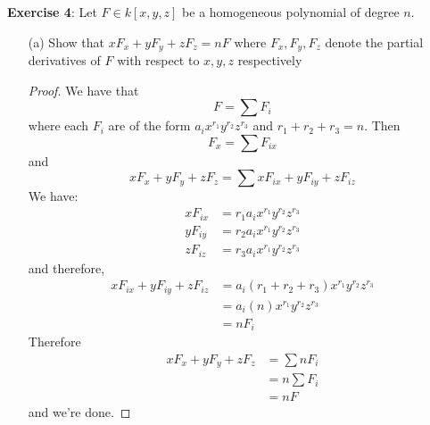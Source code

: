 \documentclass{article}
\begin{document}
\textbf{Exercise 4}: Let $F \in k[x, y, z]$ be a homogeneous polynomial of degree $n$.
    \begin{itemize}
        \item [(a)] Show that $xF_{x} + yF_{y} + zF_{z} = nF$ where $F_{x}, F_{y}, F_{z}$ denote the partial derivatives of $F$ with respect to $x, y, z$ respectively
            \begin{proof}
                We have that
                    \begin{equation*}
                        F = \sum F_{ i}
                    \end{equation*}
                where each $F_{i}$ are of the form $a_{i}x^{r_{1}}y^{r_{2}}z^{r_{3}}$ and $r_{1} + r_{2} + r_{3} = n$. Then
                    \begin{equation*}
                        F_{x} = \sum F_{ix} 
                    \end{equation*}
                and
                    \begin{equation*}
                        xF_{x} + yF_{y} + zF_{z} = \sum xF_{ ix} + yF_{iy} + zF_{iz}
                    \end{equation*}
                We have:
                    \begin{align*}
                        xF_{ix} &= r_{1}a_{i}x^{r_{1}}y^{r_{2}}z^{r_{3}} \\
                        yF_{iy} &= r_{2}a_{i}x^{r_{1}}y^{r_{2}}z^{r_{3}} \\
                        zF_{iz} &= r_{3}a_{i}x^{r_{1}}y^{r_{2}}z^{r_{3}}                     
                    \end{align*}
                and therefore,
                    \begin{align*}
                        xF_{ix} + yF_{iy} + zF_{iz} &= a_{i}(r_{1} + r_{2} + r_{3})x^{r_{1}}y^{r_{2}}z^{r_{3}} \\
                                                    &= a_{i}(n)x^{r_{1}}y^{r_{2}}z^{r_{3}} \\
                                                    &= nF_{i} 
                    \end{align*}
                Therefore
                    \begin{align*}
                        xF_{x} + yF_{y} + zF_{z} &= \sum nF_{ i} \\
                                                 &= n\sum F_{ i} \\
                                                 &= nF             
                    \end{align*}
                and we're done.
            \end{proof}


\end{itemize}
\end{document}
